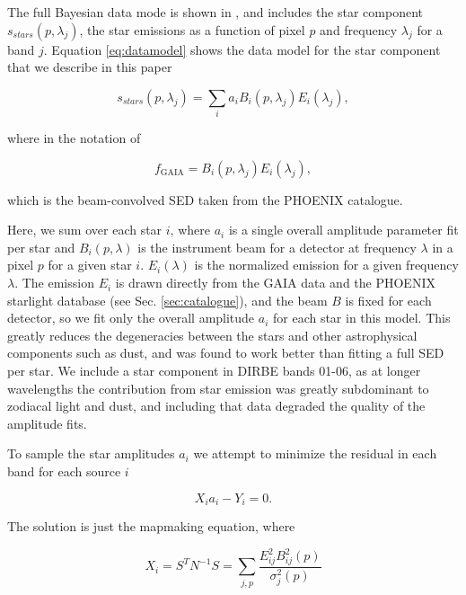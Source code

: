 \documentclass{aa}
\begin{document}
The full Bayesian data mode is shown in \cite{CG02_01}, and includes the star component $s_{stars}(p, \lambda_j)$, the star emissions as a function of pixel $p$ and frequency $\lambda_j$ for a band $j$. Equation \ref{eq:datamodel} shows the data model for the star component that we describe in this paper


\begin{equation}
s_{stars}(p, \lambda_j) = \sum_i a_i B_i(p, \lambda_j) E_i(\lambda_j),
\label{eq:datamodel}
\end{equation}

where in the notation of \cite{CG02_01} 

\begin{equation}
f_{\mathrm{GAIA}} = B_i(p, \lambda_j) E_i(\lambda_j),
\end{equation}

which is the beam-convolved SED taken from the PHOENIX catalogue.

Here, we sum over each star $i$, where $a_i$ is a single overall amplitude parameter fit per star and $B_i(p, \lambda)$ is the instrument beam for a detector at frequency $\lambda$ in a pixel $p$ for a given star $i$. $E_i(\lambda)$ is the normalized emission for a given frequency $\lambda$. The emission $E_i$ is drawn directly from the GAIA data and the PHOENIX starlight database (see Sec. \ref{sec:catalogue}), and the beam $B$ is fixed for each detector, so we fit only the overall amplitude $a_i$ for each star in this model. This greatly reduces the degeneracies between the stars and other astrophysical components such as dust, and was found to work better than fitting a full SED per star. We include a star component in DIRBE bands 01-06, as at longer wavelengths the contribution from star emission was greatly subdominant to zodiacal light and dust, and including that data degraded the quality of the amplitude fits. 

To sample the star amplitudes $a_i$ we attempt to minimize the residual in each band for each source $i$

\begin{equation}
\label{eq:minimize}
X_ia_i - Y_i = 0.
\end{equation}

The solution is just the mapmaking equation, where

\begin{equation}
X_i = S^T N^{-1} S = \sum_{j,p}\frac{E_{ij}^2 B^2_{ij}(p)}{\sigma_j^2(p)} 
\end{equation}
\end{document}
